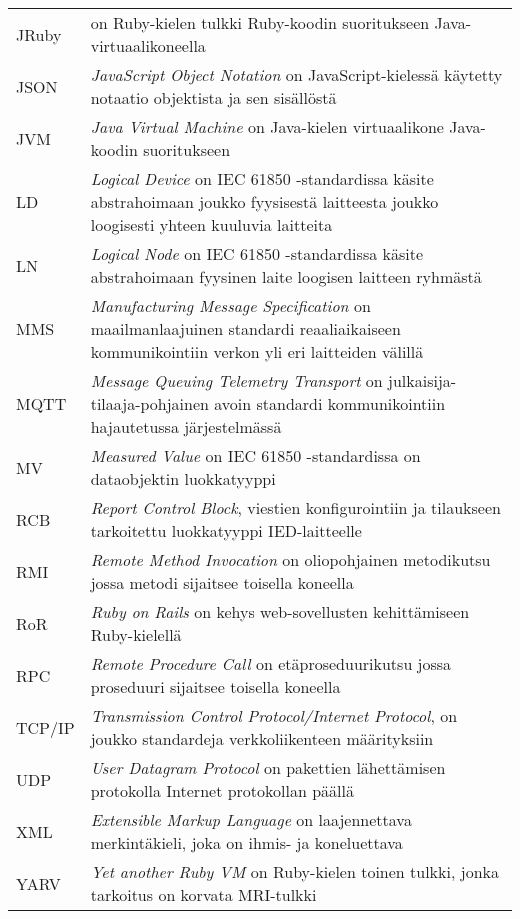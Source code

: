 \begin{tabularx}{\linewidth}[h]{@{} p{} p{} @{}}
	JRuby & on Ruby-kielen tulkki Ruby-koodin suoritukseen Java-virtuaalikoneella \\
	JSON & \emph{JavaScript Object Notation} on JavaScript-kielessä käytetty notaatio objektista ja sen sisällöstä \\
	JVM & \emph{Java Virtual Machine} on Java-kielen virtuaalikone Java-koodin suoritukseen \\
	LD & \emph{Logical Device} on IEC 61850 -standardissa käsite abstrahoimaan joukko fyysisestä laitteesta joukko loogisesti yhteen kuuluvia laitteita \\
	LN & \emph{Logical Node} on IEC 61850 -standardissa käsite abstrahoimaan fyysinen laite loogisen laitteen ryhmästä \\
	MMS & \emph{Manufacturing Message Specification} on maailmanlaajuinen standardi reaaliaikaiseen kommunikointiin verkon yli eri laitteiden välillä \\
	MQTT & \emph{Message Queuing Telemetry Transport} on julkaisija-tilaaja-pohjainen avoin standardi kommunikointiin hajautetussa järjestelmässä \\
	MV & \emph{Measured Value} on IEC 61850 -standardissa on dataobjektin luokkatyyppi \\
	RCB & \emph{Report Control Block}, viestien konfigurointiin ja tilaukseen tarkoitettu luokkatyyppi IED-laitteelle \\
	RMI & \emph{Remote Method Invocation} on oliopohjainen metodikutsu jossa metodi sijaitsee toisella koneella \\
	RoR & \emph{Ruby on Rails} on kehys web-sovellusten kehittämiseen Ruby-kielellä \\
	RPC & \emph{Remote Procedure Call} on etäproseduurikutsu jossa proseduuri sijaitsee toisella koneella \\
	TCP/IP & \emph{Transmission Control Protocol/Internet Protocol}, on joukko standardeja verkkoliikenteen määrityksiin \\
	UDP & \emph{User Datagram Protocol} on pakettien lähettämisen protokolla Internet protokollan päällä \\
	XML & \emph{Extensible Markup Language} on laajennettava merkintäkieli, joka on ihmis- ja koneluettava \\
	YARV & \emph{Yet another Ruby VM} on Ruby-kielen toinen tulkki, jonka tarkoitus on korvata MRI-tulkki \\
\end{tabularx}